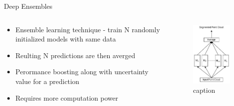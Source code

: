 \documentclass[aspectratio=169]{beamer}
\begin{document}
\begin{frame}{Deep Ensembles}
    \begin{columns}
        \begin{column}{0.5\textwidth}
            \begin{itemize}
                \item Ensemble learning technique - train N randomly initialized models with same data
                \item Reulting N predictions are then averged
                \item Perormance boosting along with uncertainty value for a prediction
                \item Requires more computation power
            \end{itemize}
        \end{column}
        \begin{column}{0.5\textwidth}
            \begin{figure}
                \centering
                \includegraphics[scale=0.5]{images/deep_ensembles.jpg}
                \caption{caption}
                \label{fig:deep_ensembles_work}    
            \end{figure}
        \end{column}
    \end{columns}
\end{frame}
\end{document}
